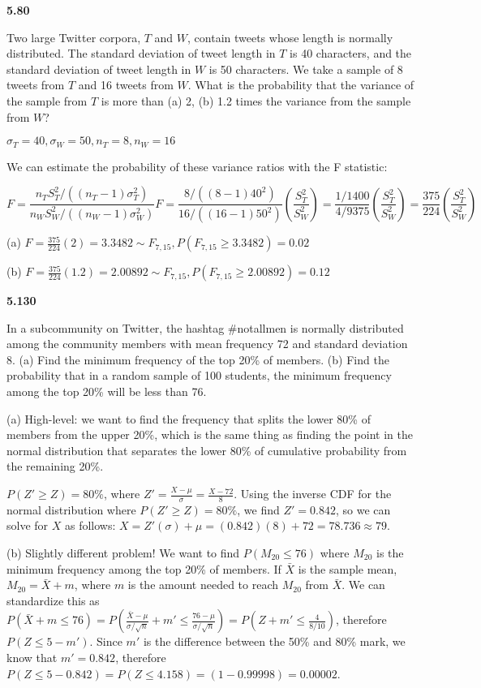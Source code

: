 \documentclass[11pt,letterpaper]{scrartcl}
\begin{document}
\textbf{5.80}

Two large Twitter corpora, $T$ and $W$, contain tweets whose length is normally distributed. 
The standard deviation of tweet length in $T$ is 40 characters, and the standard deviation of tweet length in $W$ is 50 characters. 
We take a sample of 8 tweets from $T$ and 16 tweets from $W$. What is the probability that the variance of the sample from $T$ is more than (a) 2, (b) 1.2 times the variance from the sample from $W$?

$\sigma_{T}=40, \sigma_{W}=50, n_{T}=8, n_{W}=16$

We can estimate the probability of these variance ratios with the F statistic: 

$$
F = \frac{n_{T}S_{T}^{2}/((n_{T}-1)\sigma_{T}^{2})}{n_{W}S_{W}^{2}/((n_{W}-1)\sigma_{W}^{2})}
F = \frac{8/((8-1)40^{2})}{16/((16-1)50^{2})}(\frac{S_{T}^{2}}{S_{W}^{2}}) = \frac{1/1400}{4/9375}(\frac{S_{T}^{2}}{S_{W}^{2}}) = \frac{375}{224}(\frac{S_{T}^{2}}{S_{W}^{2}})
$$

(a) $F=\frac{375}{224}(2)=3.3482 \sim F_{7,15}, P(F_{7,15} \geq 3.3482) = 0.02$

(b) $F=\frac{375}{224}(1.2) = 2.00892 \sim F_{7,15}, P(F_{7,15} \geq 2.00892) = 0.12$

\textbf{5.130}

In a subcommunity on Twitter, the hashtag \#notallmen is normally distributed among the community members with mean frequency 72 and standard deviation 8. 
(a) Find the minimum frequency of the top 20\% of members.
(b) Find the probability that in a random sample of 100 students, the minimum frequency among the top 20\% will be less than 76. 

(a) High-level: we want to find the frequency that splits the lower 80\% of members from the upper 20\%, which is the same thing as finding the point in the normal distribution that separates the lower 80\% of cumulative probability from the remaining 20\%. 

$P(Z' \geq Z) = 80\%$, where $Z' = \frac{X - \mu}{\sigma} = \frac{X - 72}{8}$. Using the inverse CDF for the normal distribution where $P(Z' \geq Z) = 80\%$, we find $Z' = 0.842$, so we can solve for $X$ as follows: $X = Z'(\sigma) + \mu = (0.842)(8) + 72=78.736 \approx 79$.

(b) Slightly different problem! 
We want to find $P(M_{20} \leq 76)$ where $M_{20}$ is the minimum frequency among the top 20\% of members. 
If $\bar{X}$ is the sample mean, $M_{20} = \bar{X} + m$, where $m$ is the amount needed to reach $M_{20}$ from $\bar{X}$.
We can standardize this as $P(\bar{X} + m \leq 76) = P(\frac{\bar{X} - \mu}{\sigma / \sqrt{n}} + m' \leq \frac{76 - \mu}{\sigma / \sqrt{n}}) = P(Z + m' \leq \frac{4}{8 / 10})$, therefore $P(Z \leq 5 - m')$.
Since $m'$ is the difference between the 50\% and 80\% mark, we know that $m' = 0.842$, therefore $P(Z \leq 5 - 0.842) = P(Z \leq 4.158) = (1 - 0.99998) = 0.00002$.
\end{document}
